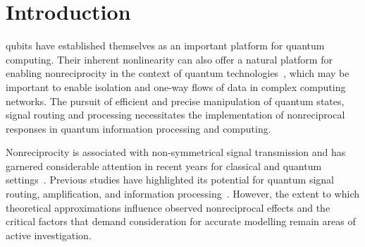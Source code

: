 \documentclass[lettersize,journal]{IEEEtran}
\begin{document}
\section{Introduction}

 qubits have established themselves as an important platform for quantum computing. Their inherent nonlinearity can also offer a natural platform for enabling nonreciprocity in the context of quantum technologies~\cite{rosario_hamann_nonreciprocity_2018, gheeraert2020programmable, rymarz2021hardware, kutsaev2021up, redchenko2023tunable}, which may be important to enable isolation and one-way flows of data in complex computing networks. The pursuit of efficient and precise manipulation of quantum states, signal routing and processing necessitates the implementation of nonreciprocal responses in quantum information processing and computing.

Nonreciprocity is associated with non-symmetrical signal transmission and has garnered considerable attention in recent years for classical and quantum settings~\cite{caloz2018electromagnetic,kord2020microwave, manipatruni2009optical, mahoney2017chip,zhang2018thermal, rosario_hamann_nonreciprocity_2018, nefedkin_nonreciprocal_2023}. Previous studies have highlighted its potential for quantum signal routing, amplification, and information processing~\cite{Furnkranz2020Quantum, Kimble2008quantum}. However, the extent to which theoretical approximations influence observed nonreciprocal effects and the critical factors that demand consideration for accurate modelling remain areas of active investigation.
\end{document}
